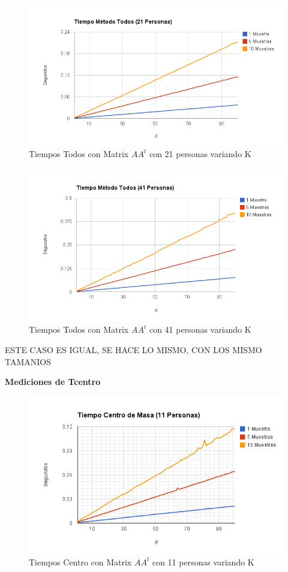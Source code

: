\begin{figure}[H]
\includegraphics[width=1\textwidth]{img/imagee.png}
     \caption{Tiempos Todos con Matrix $AA^t$ con 21 personas variando K}
\end{figure}

\begin{figure}[H]
\includegraphics[width=1\textwidth]{img/imagef.png}
     \caption{Tiempos Todos con Matrix $AA^t$ con 41 personas variando K}
\end{figure}

ESTE CASO ES IGUAL, SE HACE LO MISMO, CON LOS MISMO TAMANIOS

\textbf{Mediciones de Tcentro }

\begin{figure}[H]
\includegraphics[width=1\textwidth]{img/imageg.png}
     \caption{Tiempos Centro con Matrix $AA^t$ con 11 personas variando K}
\end{figure}


